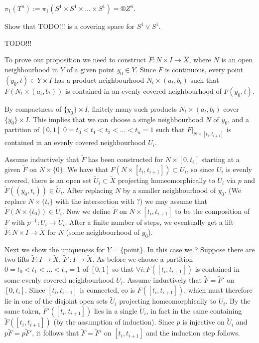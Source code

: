 \documentclass[12pt]{article}					%
\begin{document}
\begin{dusledek}
	$π_1(T^n) := π_1(S^1 \times S^1 \times … \times S^1) = ®Z^n$.
\end{dusledek}

\begin{priklad}
	Show that TODO!!! is a covering space for $S^1 \vee S^1$.
\end{priklad}

TODO!!!


\begin{dukaz}[Proposition *]
	To prove our proposition we need to construct $\tilde F: N \times I \rightarrow \tilde X$, where $N$ is an open neighbourhood in $Y$ of a given point $y_0 \in Y$. Since $F$ is continuous, every point $(y_0, t) \in Y \times I$ has a product neighbourhood $N_t \times (a_t, b_t)$ such that $F(N_t \times (a_t, b_t))$ is contained in an evenly covered neighbourhood of $F(y_0, t)$.

	By compactness of $\{y_0\} \times I$, finitely many such products $N_t \times (a_t, b_t)$ cover $\{y_0\} \times I$. This implies that we can choose a single neighbourhood $N$ of $y_0$, and a partition of $[0, 1]$ $0 = t_0 < t_1 < t_2 < … < t_n = 1$ such that $F|_{N \times [t_i, t_{i+1}]}$ is contained in an evenly covered neighbourhood $U_i$.

	Assume inductively that $\tilde F$ has been constructed for $N \times [0, t_i]$ starting at a given $\tilde F$ on $N \times \{0\}$. We have that $F(N \times [t_i, t_{i+1}]) \subset U_i$, so since $U_i$ is evenly covered, there is an open set $\tilde U_i \subset \tilde X$ projecting homeomorphically to $U_i$ via $p$ and $\tilde F((y_0, t_i)) \in \tilde U_i$. After replacing $N$ by a smaller neighbourhood of $y_0$. (We replace $N \times \{t_i\}$ with the intersection with ?) we may assume that $\tilde F(N \times \{t_0\}) \in \tilde U_i$. Now we define $\tilde F$ on $N \times [t_i, t_{i+1}]$ to be the composition of $F$ with $p^{-1}: U_i \rightarrow \tilde U_i$. After a finite number of steps, we eventually get a lift $\tilde F: N \times I \rightarrow \tilde X$ for $N$ (some neighbourhood of $y_0$).

	Next we show the uniqueness for $Y = \{\text{point}\}$. In this case we ?
	Suppose there are two lifts $\tilde F: I \rightarrow \tilde X$, $\tilde F': I \rightarrow \tilde X$. As before we choose a partition $0 = t_0 < t_1 < … < t_n = 1$ of $[0, 1]$ so that $\forall i: F([t_i, t_{i+1}])$ is contained in some evenly covered neighbourhood $U_i$. Assume inductively that $\tilde F = \tilde F'$ on $[0, t_i]$. Since $[t_i, t_{i+1}]$ is connected, co is $\tilde F([t_i, t_{i+1}])$, which must therefore lie in one of the disjoint open sets $\tilde U_i$ projecting homeomorphically to $U_i$. By the same token, $\tilde F'([t_i, t_{i+1}])$ lies in a single $\tilde U_i$, in fact in the same containing $\tilde F([t_i, t_{i+1}])$ (by the assumption of induction). Since $p$ is injective on $\tilde U_i$ and $p \tilde F = p \tilde F'$, it follows that $\tilde F = \tilde F'$ on $[t_i, t_{i+1}]$ and the induction step follows.


\end{dukaz}
\end{document}
